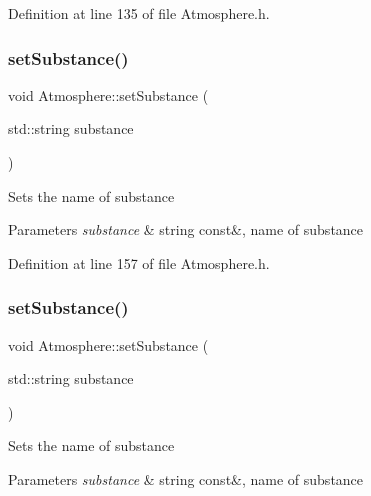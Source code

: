 Definition at line 135 of file Atmosphere.\+h.

\mbox{\label{class_atmosphere_aa92f55a1f07304f3e57fdfb8ece65d82}} 
\subsubsection{\texorpdfstring{set\+Substance()}{setSubstance()}\hspace{0.1cm}{\footnotesize\ttfamily [1/3]}}
{\footnotesize\ttfamily void Atmosphere\+::set\+Substance (\begin{DoxyParamCaption}\item[{std\+::string}]{substance }\end{DoxyParamCaption})\hspace{0.3cm}{\ttfamily [inline]}}

Sets the name of substance 
\begin{DoxyParams}{Parameters}
{\em substance} & string const\&, name of substance \\
\hline
\end{DoxyParams}


Definition at line 157 of file Atmosphere.\+h.

\mbox{\label{class_atmosphere_aa92f55a1f07304f3e57fdfb8ece65d82}} 
\subsubsection{\texorpdfstring{set\+Substance()}{setSubstance()}\hspace{0.1cm}{\footnotesize\ttfamily [2/3]}}
{\footnotesize\ttfamily void Atmosphere\+::set\+Substance (\begin{DoxyParamCaption}\item[{std\+::string}]{substance }\end{DoxyParamCaption})\hspace{0.3cm}{\ttfamily [inline]}}

Sets the name of substance 
\begin{DoxyParams}{Parameters}
{\em substance} & string const\&, name of substance \\
\hline
\end{DoxyParams}



